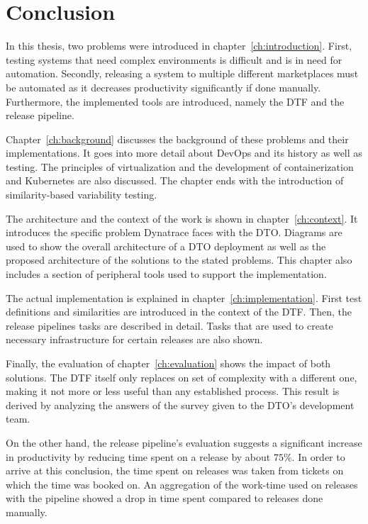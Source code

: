 \chapter{Conclusion}\label{ch:conclusion}

In this thesis, two problems were introduced in chapter~\ref{ch:introduction}.
First, testing systems that need complex environments is difficult and is in need for automation.
Secondly, releasing a system to multiple different marketplaces must be automated as it decreases productivity significantly if done manually.
Furthermore, the implemented tools are introduced, namely the DTF and the release pipeline.

Chapter~\ref{ch:background} discusses the background of these problems and their implementations.
It goes into more detail about DevOps and its history as well as testing.
The principles of virtualization and the development of containerization and Kubernetes are also discussed.
The chapter ends with the introduction of similarity-based variability testing.

The architecture and the context of the work is shown in chapter~\ref{ch:context}.
It introduces the specific problem Dynatrace faces with the DTO.
Diagrams are used to show the overall architecture of a DTO deployment as well as the proposed architecture of the solutions to the stated problems.
This chapter also includes a section of peripheral tools used to support the implementation.

The actual implementation is explained in chapter~\ref{ch:implementation}.
First test definitions and similarities are introduced in the context of the DTF.
Then, the release pipelines tasks are described in detail.
Tasks that are used to create necessary infrastructure for certain releases are also shown.

Finally, the evaluation of chapter~\ref{ch:evaluation} shows the impact of both solutions.
The DTF itself only replaces on set of complexity with a different one, making it not more or less useful than any established process.
This result is derived by analyzing the answers of the survey given to the DTO's development team.

\pagebreak

On the other hand, the release pipeline's evaluation suggests a significant increase in productivity by reducing time spent on a release by about $75 \%$.
In order to arrive at this conclusion, the time spent on releases was taken from tickets on which the time was booked on.
An aggregation of the work-time used on releases with the pipeline showed a drop in time spent compared to releases done manually.

